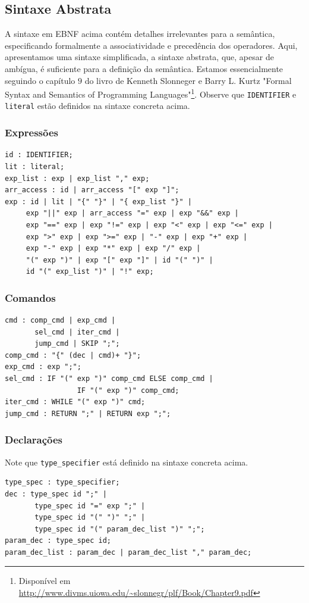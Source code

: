 \documentclass[12pt]{article}
\begin{document}
\subsection{Sintaxe Abstrata}
A sintaxe em EBNF acima contém detalhes irrelevantes para a semântica, especificando formalmente a associatividade e precedência dos operadores. Aqui, apresentamos uma sintaxe simplificada, a sintaxe abstrata, que, apesar de ambígua, é suficiente para a definição da semântica. Estamos essencialmente seguindo o capítulo $9$ do livro de Kenneth Slonneger e Barry L. Kurtz "Formal Syntax and Semantics of Programming Languages"\footnote{Disponível em \url{http://www.divms.uiowa.edu/~slonnegr/plf/Book/Chapter9.pdf}}.
Observe que \verb!IDENTIFIER! e \verb!literal! estão definidos na sintaxe concreta acima.
\subsubsection{Expressões}

\begin{verbatim}
id : IDENTIFIER;
lit : literal;
exp_list : exp | exp_list "," exp;
arr_access : id | arr_access "[" exp "]";
exp : id | lit | "{" "}" | "{ exp_list "}" |
     exp "||" exp | arr_access "=" exp | exp "&&" exp |
     exp "==" exp | exp "!=" exp | exp "<" exp | exp "<=" exp |
     exp ">" exp | exp ">=" exp | "-" exp | exp "+" exp |
     exp "-" exp | exp "*" exp | exp "/" exp |
     "(" exp ")" | exp "[" exp "]" | id "(" ")" |
     id "(" exp_list ")" | "!" exp;
\end{verbatim}

\subsubsection{Comandos}
\begin{verbatim}
cmd : comp_cmd | exp_cmd | 
       sel_cmd | iter_cmd |
       jump_cmd | SKIP ";";
comp_cmd : "{" (dec | cmd)+ "}";
exp_cmd : exp ";";
sel_cmd : IF "(" exp ")" comp_cmd ELSE comp_cmd |
                 IF "(" exp ")" comp_cmd;
iter_cmd : WHILE "(" exp ")" cmd;
jump_cmd : RETURN ";" | RETURN exp ";";
\end{verbatim}

\subsubsection{Declarações}
Note que \verb!type_specifier! está definido na sintaxe concreta acima.
\begin{verbatim}
type_spec : type_specifier;
dec : type_spec id ";" | 
       type_spec id "=" exp ";" |
       type_spec id "(" ")" ";" |
       type_spec id "(" param_dec_list ")" ";";
param_dec : type_spec id;
param_dec_list : param_dec | param_dec_list "," param_dec;
\end{verbatim}
\end{document}
